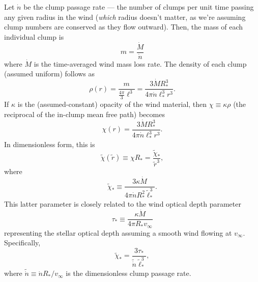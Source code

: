 \documentclass{article}
\newcommand{\vinf}{v_{\infty}}
\newcommand{\Rstar}{R_{\ast}}
\newcommand{\tr}{\tilde{r}}
\newcommand{\tell}{\tilde{\ell}}
\newcommand{\tchi}{\tilde{\chi}}
\newcommand{\tchistar}{\tilde{\chi}_{\ast}}
\newcommand{\ellstar}{\ell_{\ast}}
\newcommand{\tellstar}{\tell_{\ast}}
\newcommand{\taustar}{\tau_{\ast}}
\begin{document}
Let $\dot{n}$ be the clump passage rate --- the number of clumps per
unit time passing any given radius in the wind (\emph{which} radius
doesn't matter, as we're assuming clump numbers are conserved as they
flow outward). Then, the mass of each individual clump is
%
\begin{equation}
  m = \frac{\dot{M}}{\dot{n}}
\end{equation}
%
where $\dot{M}$ is the time-averaged wind mass loss rate. The density
of each clump (assumed uniform) follows as
%
\begin{equation}
  \rho(r) = \frac{m}{\frac{4\pi}{3} \ell^{3}} =
  \frac{3 \dot{M} \Rstar^{3}}{4\pi \dot{n} \ellstar^{3} r^{3}}.
\end{equation}
%
If $\kappa$ is the (assumed-constant) opacity of the wind material,
then $\chi \equiv \kappa\rho$ (the reciprocal of the in-clump mean
free path) becomes
%
\begin{equation}
  \chi(r) = \frac{3 \dot{M} \Rstar^{3}}{4\pi \dot{n} \ellstar^{3} r^{3}}.
\end{equation}
%
In dimensionless form, this is
%
\begin{equation}
  \tchi(\tr) \equiv \chi \Rstar = \frac{\tchistar}{\tr^{3}},
\end{equation}
%
where
\begin{equation}
  \tchistar \equiv \frac{3 \kappa \dot{M}}{4\pi \dot{n} \Rstar^{2} \tellstar^{3}}.
\end{equation}
%
This latter parameter is closely related to the wind optical depth parameter
%
\begin{equation}
  \taustar \equiv \frac{\kappa \dot{M}}{4 \pi \Rstar \vinf}
\end{equation}
%
representing the stellar optical depth assuming a smooth wind flowing
at $\vinf$. Specifically,
%
\begin{equation}
  \tchistar = \frac{3 \taustar}{\tilde{\dot{n}} \tellstar^{3}},
\end{equation}
%
where $\tilde{\dot{n}} \equiv \dot{n} \Rstar/\vinf$ is the dimensionless clump passage rate.
\end{document}
